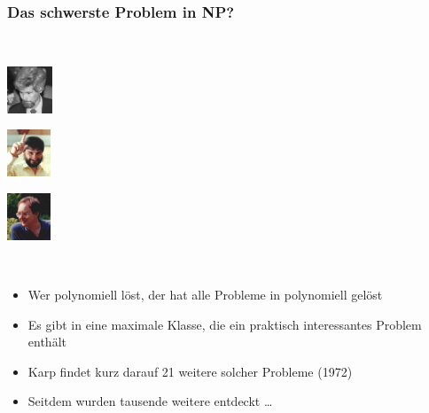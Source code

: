 \documentclass[aspectratio=1610,onlymath]{beamer}
\begin{document}
\begin{frame}\frametitle{Das schwerste Problem in NP?}

\bigskip
~\hfill%
\begin{minipage}{1.5cm}\includegraphics[height=1.4cm]{images/cook}\\\end{minipage}\hfill
\begin{minipage}{1.5cm}\includegraphics[height=1.4cm]{images/levin}\\\end{minipage}\hfill
\begin{minipage}{1.5cm}\includegraphics[height=1.4cm]{images/karp}\\\end{minipage}\hfill~
\bigskip

\pause

\begin{itemize}
\item Wer  polynomiell löst, der hat alle Probleme in  polynomiell gelöst\pause
\item Es gibt in  eine maximale Klasse, die ein praktisch interessantes Problem enthält\pause
\item Karp findet kurz darauf 21 weitere solcher Probleme (1972)
\item Seitdem wurden tausende weitere entdeckt \ldots
\end{itemize}
\bigskip


\end{frame}
\end{document}
